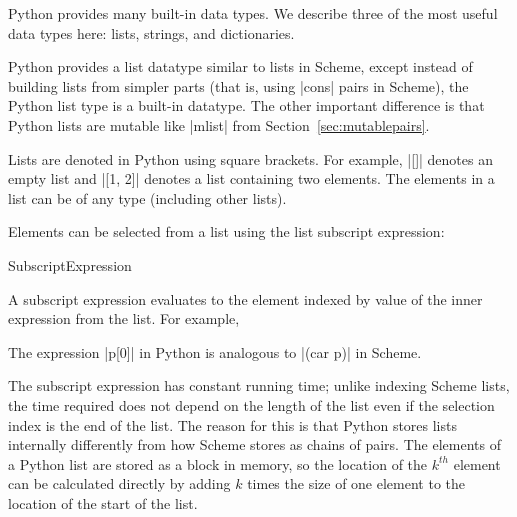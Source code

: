 Python provides many built-in data types.  We describe three of the most useful data types here: lists, strings, and dictionaries.

  Python provides a list datatype similar to lists in Scheme, except instead of building lists from simpler parts (that is, using \scheme|cons| pairs in Scheme), the Python list type is a built-in datatype.  The other important difference is that Python lists are mutable like \scheme|mlist| from Section~\ref{sec:mutablepairs}.

Lists are denoted in Python using square brackets.  For example, \pycode|[]| denotes an empty list and \pycode|[1, 2]| denotes a list containing two elements.  The elements in a list can be of any type (including other lists).

Elements can be selected from a list using the list subscript expression:
\begin{bnfgrammarm}{SubscriptExpression}
\end{bnfgrammarm}
A subscript expression evaluates to the element indexed by value of the inner expression from the list.  For example,

\begin{pythoninteracts}
\end{pythoninteracts}

The expression \pycode|p[0]| in Python is analogous to \scheme|(car p)| in Scheme.


The subscript expression has constant running time; unlike indexing Scheme lists, the time required does not depend on the length of the list even if the selection index is the end of the list.  The reason for this is that Python stores lists internally differently from how Scheme stores as chains of pairs.  The elements of a Python list are stored as a block in memory, so the location of the $k^{th}$ element can be calculated directly by adding $k$ times the size of one element to the location of the start of the list.  

